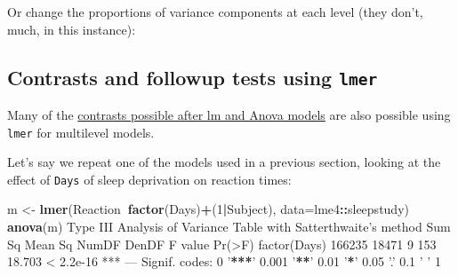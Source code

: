 \documentclass[]{article}
\newenvironment{Shaded}{\begin{snugshade}}{\end{snugshade}}
\newcommand{\CommentTok}[1]{\textcolor[rgb]{0.56,0.35,0.01}{\textit{#1}}}
\newcommand{\DataTypeTok}[1]{\textcolor[rgb]{0.13,0.29,0.53}{#1}}
\newcommand{\DecValTok}[1]{\textcolor[rgb]{0.00,0.00,0.81}{#1}}
\newcommand{\ErrorTok}[1]{\textcolor[rgb]{0.64,0.00,0.00}{\textbf{#1}}}
\newcommand{\FloatTok}[1]{\textcolor[rgb]{0.00,0.00,0.81}{#1}}
\newcommand{\KeywordTok}[1]{\textcolor[rgb]{0.13,0.29,0.53}{\textbf{#1}}}
\newcommand{\NormalTok}[1]{#1}
\newcommand{\OperatorTok}[1]{\textcolor[rgb]{0.81,0.36,0.00}{\textbf{#1}}}
\newcommand{\StringTok}[1]{\textcolor[rgb]{0.31,0.60,0.02}{#1}}
\begin{document}
Or change the proportions of variance components at each level (they don't,
much, in this instance):

\begin{Shaded}
\end{Shaded}

\hypertarget{contrasts-lmer}{%
\subsection*{\texorpdfstring{Contrasts and followup tests using \texttt{lmer}}{Contrasts and followup tests using lmer}}\label{contrasts-lmer}}

Many of the \protect\hyperlink{contrasts-examples}{contrasts possible after lm and Anova models}
are also possible using \texttt{lmer} for multilevel models.

Let's say we repeat one of the models used in a previous section, looking at the
effect of \texttt{Days} of sleep deprivation on reaction times:

\begin{Shaded}
\begin{Highlighting}[]
\NormalTok{m <-}\StringTok{ }\KeywordTok{lmer}\NormalTok{(Reaction}\OperatorTok{~}\KeywordTok{factor}\NormalTok{(Days)}\OperatorTok{+}\NormalTok{(}\DecValTok{1}\OperatorTok{|}\NormalTok{Subject), }\DataTypeTok{data=}\NormalTok{lme4}\OperatorTok{::}\NormalTok{sleepstudy)}
\KeywordTok{anova}\NormalTok{(m)}
\NormalTok{Type III Analysis of Variance Table with Satterthwaite}\StringTok{'s method}
\StringTok{             Sum Sq Mean Sq NumDF DenDF F value    Pr(>F)    }
\StringTok{factor(Days) 166235   18471     9   153  18.703 < 2.2e-16 ***}
\StringTok{---}
\StringTok{Signif. codes:  0 '}\OperatorTok{**}\ErrorTok{*}\StringTok{' 0.001 '}\OperatorTok{**}\StringTok{' 0.01 '}\OperatorTok{*}\StringTok{' 0.05 '}\NormalTok{.}\StringTok{' 0.1 '} \StringTok{' 1}
\end{Highlighting}
\end{Shaded}
\end{document}
